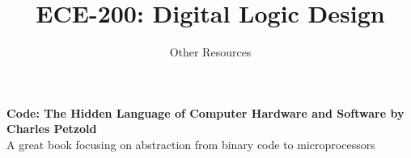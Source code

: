 \documentclass[10pt,letterpaper,oneside]{article}
\title{ECE-200: Digital Logic Design}
\author{Other Resources}
\date{}
\begin{document}
\maketitle

\textbf{Code: The Hidden Language of Computer Hardware and Software by Charles Petzold} \\
A great book focusing on abstraction from binary code to microprocessors
\vspace{5mm}
\end{document}
